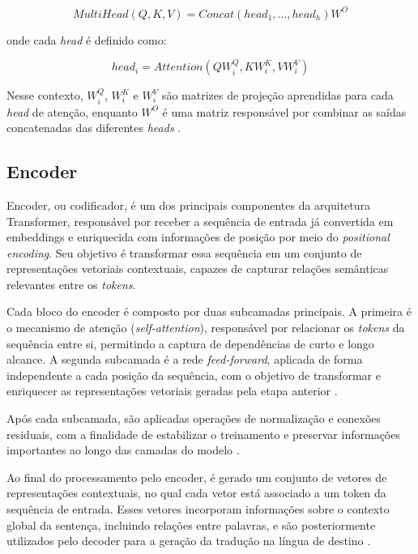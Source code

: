 \begin{equation}
    {MultiHead}(Q, K, V) = {Concat}({head}_1, \dots, {head}_h)W^O
    \label{eq:multi-head-attention}
\end{equation}

onde cada \textit{head} é definido como:

\begin{equation}
    {head}_i = {Attention}(QW_i^Q, KW_i^K, VW_i^V)
    \label{eq:head-mecanism-attention}
\end{equation}

Nesse contexto, \(W_i^Q\), \(W_i^K\) e \(W_i^V\) são matrizes de projeção
aprendidas para cada \textit{head} de atenção, enquanto \(W^O\) é uma matriz
responsável por combinar as saídas concatenadas das diferentes \textit{heads}
\cite{DBLP:journals/corr/abs-2006-16362}.

\subsection{Encoder}
Encoder, ou codificador, é um dos principais componentes da arquitetura
Transformer, responsável por receber a sequência de entrada já convertida em
embeddings e enriquecida com informações de posição por meio do
\textit{positional encoding}. Seu objetivo é transformar essa sequência em um
conjunto de representações vetoriais contextuais, capazes de capturar relações
semânticas relevantes entre os \textit{tokens}.

Cada bloco do encoder é composto por duas subcamadas principais. A primeira é o
mecanismo de atenção (\textit{self-attention}), responsável por relacionar os
\textit{tokens} da sequência entre si, permitindo a captura de dependências de curto e
longo alcance. A segunda subcamada é a rede \textit{feed-forward}, aplicada de
forma independente a cada posição da sequência, com o objetivo de transformar e
enriquecer as representações vetoriais geradas pela etapa anterior \cite{build-llms-from-scratch-book}.

Após cada subcamada, são aplicadas operações de normalização e conexões
residuais, com a finalidade de estabilizar o treinamento e preservar
informações importantes ao longo das camadas do modelo \cite{build-llms-from-scratch-book}.

Ao final do processamento pelo encoder, é gerado um conjunto de vetores de
representações contextuais, no qual cada vetor está associado a um token da
sequência de entrada. Esses vetores incorporam informações sobre o contexto
global da sentença, incluindo relações entre palavras, e são posteriormente
utilizados pelo decoder para a geração da tradução na língua de destino
\cite{build-llms-from-scratch-book}.

